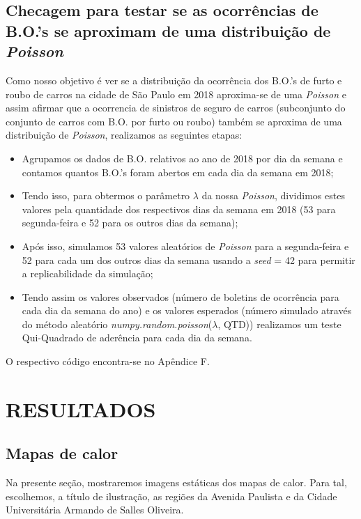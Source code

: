 \documentclass[
	12pt,
	openright,			%
	twoside,			%
	a4paper,			%
	chapter=TITLE,		%
	section=TITLE,		%
	subsection=TITLE,	%
	subsubsection=TITLE,%
	english,			%
	french,				%
	spanish,			%
	brazil				%
	]{abntex2}
\begin{document}
\section{Checagem para testar se as ocorrências de B.O.'s se aproximam de uma distribuição de \textit{Poisson}}
Como nosso objetivo é ver se a distribuição da ocorrência dos B.O.'s de furto e roubo de carros na cidade de São Paulo em 2018 aproxima-se de uma \textit{Poisson} e assim afirmar que a ocorrencia de sinistros de seguro de carros (subconjunto do conjunto de carros com B.O. por furto ou roubo) também se aproxima de uma distribuição de \textit{Poisson}, realizamos as seguintes etapas:
\begin{itemize}
    \item Agrupamos os dados de B.O. relativos ao ano de 2018 por dia da semana e contamos quantos B.O.'s foram abertos em cada dia da semana em 2018;
    \item Tendo isso, para obtermos o parâmetro $\lambda$ da nossa \textit{Poisson}, dividimos estes valores pela quantidade dos respectivos dias da semana em 2018 (53 para segunda-feira e 52 para os outros dias da semana);
    \item Após isso, simulamos 53 valores aleatórios de \textit{Poisson} para a segunda-feira e 52 para cada um dos outros dias da semana usando a \textit{seed} = 42 para permitir a replicabilidade da simulação;
    \item Tendo assim os valores observados (número de boletins de ocorrência para cada dia da semana do ano) e os valores esperados (número simulado através do método aleatório \textit{numpy.random.poisson}($\lambda$, QTD)) realizamos um teste Qui-Quadrado de aderência para cada dia da semana.
\end{itemize}

O respectivo código encontra-se no Apêndice F.


\chapter{RESULTADOS}

\section{Mapas de calor}
Na presente seção, mostraremos imagens estáticas dos mapas de calor. Para tal, escolhemos, a título de ilustração,  as regiões da Avenida Paulista e da Cidade Universitária Armando de Salles Oliveira. 
\end{document}
